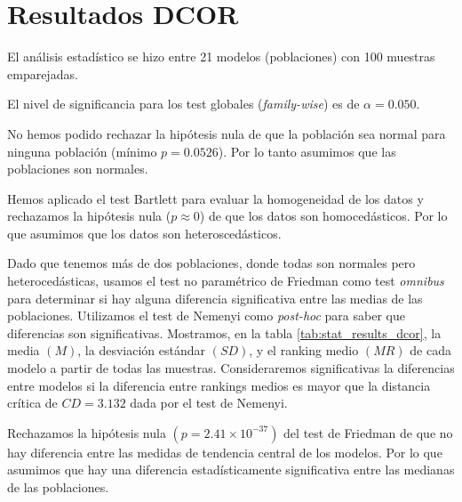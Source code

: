 \documentclass[a4paper,oneside,11pt,leqno]{article}
\begin{document}
	\section{Resultados DCOR}
	\label{sec:results_dcor}

	El análisis estadístico se hizo entre 21 modelos (poblaciones) con 100 muestras emparejadas.

	El nivel de significancia para los test globales (\textit{family-wise}) es de $\alpha=0.050$.

	No hemos podido rechazar la hipótesis nula de que la población sea normal para ninguna población (mínimo $p=0.0526$). Por lo tanto asumimos que las poblaciones son normales.

	Hemos aplicado el test Bartlett para evaluar la homogeneidad de los datos y rechazamos la hipótesis nula ($p\approx 0$) de que los datos son homocedásticos. Por lo que asumimos que los datos son heteroscedásticos.

	Dado que tenemos más de dos poblaciones, donde todas son normales pero heterocedásticas, usamos el test no paramétrico de Friedman como test \textit{omnibus} para determinar si hay alguna diferencia significativa entre las medias de las poblaciones. Utilizamos el test de Nemenyi como \textit{post-hoc} para saber que diferencias son significativas. Mostramos, en la tabla \ref{tab:stat_results_dcor}, la media $(M)$, la desviación estándar $(SD)$, y el ranking medio $(MR)$ de cada modelo a partir de todas las muestras. Consideraremos significativas la diferencias entre modelos si la diferencia entre rankings medios es mayor que la distancia crítica de $CD=3.132$ dada por el test de Nemenyi.

	Rechazamos la hipótesis nula $(p=2.41\times 10^{-37})$ del test de Friedman de que no hay diferencia entre las medidas de tendencia central de los modelos. Por lo que asumimos que hay una diferencia estadísticamente significativa entre las medianas de las poblaciones.
\end{document}
